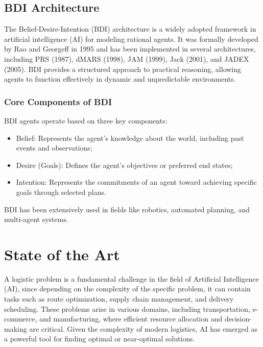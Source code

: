 \subsection{BDI Architecture}
\label{sub:bdi_architecture}

The Belief-Desire-Intention (BDI) architecture is a widely adopted framework in
artificial intelligence (AI) for modeling rational agents. It was formally developed
by Rao and Georgeff in 1995 \cite{bdi-icmas95} and has been implemented in several
architectures, including PRS (1987), dMARS (1998), JAM (1999), Jack (2001), and
JADEX (2005). BDI provides a structured approach to practical reasoning,
allowing agents to function effectively in dynamic and unpredictable
environments.

\subsubsection{Core Components of BDI}
BDI agents operate based on three key components:
\begin{itemize}
  \item Belief: Represents the agent's knowledge about the world, including past
    events and observations;

  \item Desire (Goals): Defines the agent's objectives or preferred end states;

  \item Intention: Represents the commitments of an agent toward achieving
    specific goals through selected plans.
\end{itemize}

BDI has been extensively used in fields like robotics, automated planning, and
multi-agent systems.

\section{State of the Art}
\label{sec:state_of_the_art}

A logistic problem is a fundamental challenge in the field of Artificial Intelligence
(AI), since depending on the complexity of the specific problem, it can contain tasks
such as route optimization, supply chain management, and delivery scheduling.
These problems arise in various domains, including transportation, e-commerce, and
manufacturing, where efficient resource allocation and decision-making are
critical. Given the complexity of modern logistics, AI has emerged as a powerful
tool for finding optimal or near-optimal solutions.

